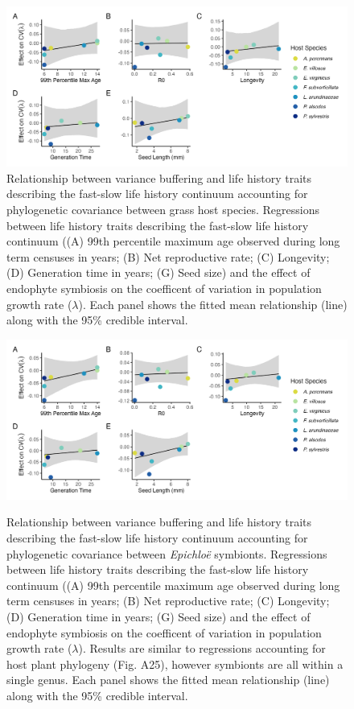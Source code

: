 \documentclass[9pt,twoside,lineno]{pnas-new}
\begin{document}
\begin{figure}
	\centering
	\includegraphics[width=\linewidth]{lh_plant_plot.png}
	\caption{Relationship between variance buffering and life history traits describing the fast-slow life history continuum accounting for phylogenetic covariance between grass host species. Regressions between life history traits describing the fast-slow life history continuum ((A) 99th percentile maximum age observed during long term censuses in years; (B) Net reproductive rate; (C) Longevity; (D) Generation time in years; (G) Seed size) and the effect of endophyte symbiosis on the coefficent of variation in population growth rate ($\lambda$). Each panel shows the fitted mean relationship (line) along with the 95\% credible interval.}
\end{figure}
\newpage

\begin{figure}
	\centering
	\includegraphics[width=\linewidth]{lh_epichloe_plot.png}
	\label{fig:lh_epich}
	\caption{Relationship between variance buffering and life history traits describing the fast-slow life history continuum accounting for phylogenetic covariance between \emph{Epichlo\"{e}} symbionts. Regressions between life history traits describing the fast-slow life history continuum ((A) 99th percentile maximum age observed during long term censuses in years; (B) Net reproductive rate; (C) Longevity; (D) Generation time in years; (G) Seed size) and the effect of endophyte symbiosis on the coefficent of variation in population growth rate ($\lambda$). Results are similar to regressions accounting for host plant phylogeny (Fig. A25), however symbionts are all within a single genus. Each panel shows the fitted mean relationship (line) along with the 95\% credible interval.}
\end{figure}
\newpage
\end{document}
